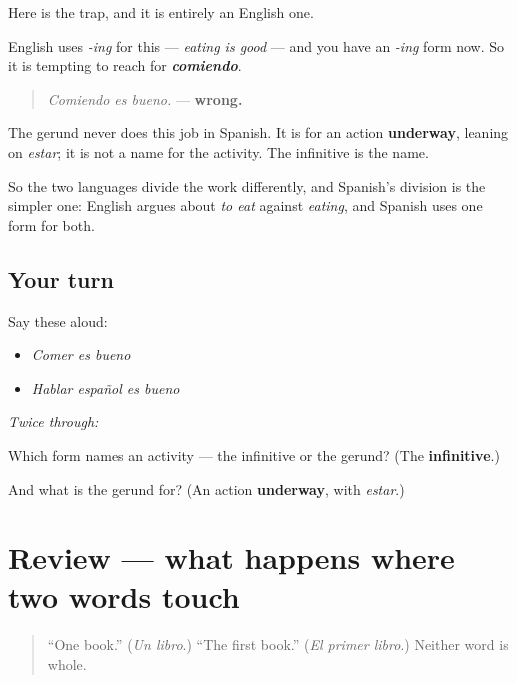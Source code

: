 \begin{culture}
Here is the trap, and it is entirely an English one.

English uses \emph{-ing} for this — \emph{eating is good} — and you have an \emph{-ing} form now. So it is tempting to reach for \emph{\textbf{comiendo}}.

\begin{quote}
\emph{Comiendo es bueno.} — \textbf{wrong.}
\end{quote}

The gerund never does this job in Spanish. It is for an action \textbf{underway}, leaning on \emph{estar}; it is not a name for the activity. The infinitive is the name.

So the two languages divide the work differently, and Spanish's division is the simpler one: English argues about \emph{to eat} against \emph{eating}, and Spanish uses one form for both.
\end{culture}

\subsection*{Your turn}
Say these aloud:

\begin{itemize}
\raggedright
  \item \emph{Comer es bueno}
  \item \emph{Hablar español es bueno}
\end{itemize}

\emph{Twice through:}

\begin{tcolorbox}[breakable,colback=teal!4,colframe=teal!35!black,title={Before you move on}]
Which form names an activity — the infinitive or the gerund? (The \textbf{infinitive}.)

And what is the gerund for? (An action \textbf{underway}, with \emph{estar}.)
\end{tcolorbox}
\section[(review)]{Review — what happens where two words touch}

\label{lesson:ES-C67-repaso-cuando-dos-palabras-se-tocan}



\begin{quote}
\textquotedblleft{}One book.\textquotedblright{} (\emph{Un libro}.) \textquotedblleft{}The first book.\textquotedblright{} (\emph{El primer libro}.) Neither word is whole.
\end{quote}

